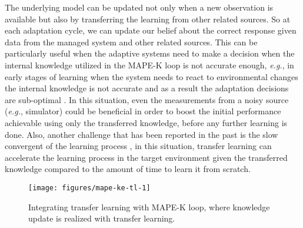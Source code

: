 The underlying model can be updated not only when a new observation is available but also by transferring the learning from other related sources. So at each adaptation cycle, we can update our belief about the correct response given data from the managed system and other related sources. This can be particularly useful when the adaptive systems need to make a decision when the internal knowledge utilized in the MAPE-K loop is not accurate enough, \emph{e.g.}, in early stages of learning when the system needs to react to environmental changes the internal knowledge is not accurate and as a result the adaptation decisions are sub-optimal \cite{jamshidi2016fuzzy}. In this situation, even the measurements from a noisy source (\emph{e.g.}, simulator) could be beneficial in order to boost the initial performance achievable using only the transferred knowledge, before any further learning is done. Also, another challenge that has been reported in the past is the slow convergent of the learning process \cite{jamshidi2016fuzzy}, in this situation, transfer learning can accelerate the learning process in the target environment given the transferred knowledge compared to the amount of time to learn it from scratch. %



\begin{figure}[t]
	\begin{center}
		\texttt{[image: figures/mape-ke-tl-1]}
		\caption{Integrating transfer learning with MAPE-K loop, where knowledge update is realized with transfer learning.}
		\label{fig:mape-ke}
	\end{center}
\end{figure}
